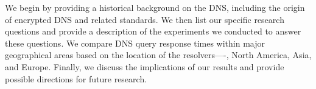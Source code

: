 We begin by providing a historical background on the DNS, including the origin of encrypted DNS and related standards.
We then list our specific research questions and provide a description of the experiments we conducted to answer these questions.
We compare DNS query response times within major geographical areas based on the location of the resolvers—-\ie, North America, Asia, and Europe.
Finally, we discuss the implications of our results and provide possible directions for future research.
